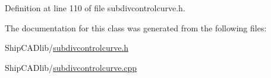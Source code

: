 Definition at line 110 of file subdivcontrolcurve.\-h.



The documentation for this class was generated from the following files\-:\begin{DoxyCompactItemize}
\item 
Ship\-C\-A\-Dlib/\hyperlink{subdivcontrolcurve_8h}{subdivcontrolcurve.\-h}\item 
Ship\-C\-A\-Dlib/\hyperlink{subdivcontrolcurve_8cpp}{subdivcontrolcurve.\-cpp}\end{DoxyCompactItemize}
